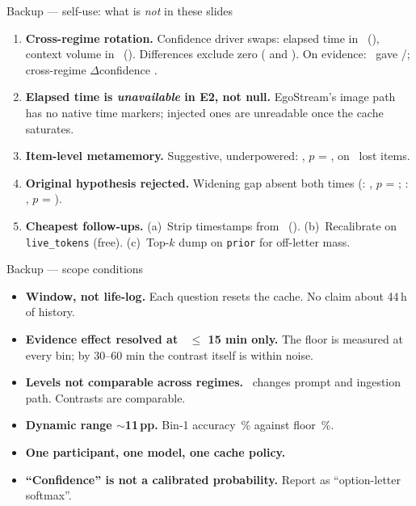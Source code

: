 \begin{frame}[t]{Backup --- self-use: what is \emph{not} in these slides}
  \footnotesize
  \begin{enumerate}\setlength\itemsep{0.35em}
    \item \textbf{Cross-regime rotation.} Confidence driver swaps: elapsed time in \Eone\ (\conf{\EoneElapsedConf}), context volume in \Etwo\ (\conf{\EtwoFourxConf}). Differences exclude zero (\conf{\XregElapsedConf} and \conf{\XregFourxConf}). On evidence: \Eone\ gave \acc{\EoneEvidenceAcc}/\conf{\EoneEvidenceConf}; cross-regime $\Delta$confidence \conf{\XregEvidenceConf}.

    \item \textbf{Elapsed time is \emph{unavailable} in E2, not null.} EgoStream's image path has no native time markers; injected ones are unreadable once the cache saturates.

    \item \textbf{Item-level metamemory.} Suggestive, underpowered: \EtwoItemDiff, $p$ = \EtwoItemDiffP, on \EtwoItemLost\ lost items.

    \item \textbf{Original hypothesis rejected.} Widening gap absent both times (\Eone: \EoneGap, $p$ = \EoneGapP; \Etwo: \EtwoGap, $p$ = \EtwoGapP).

    \item \textbf{Cheapest follow-ups.} (a)~Strip timestamps from \Eone\ (\TimestripCost). (b)~Recalibrate on \texttt{live\_tokens} (free). (c)~Top-$k$ dump on \texttt{prior} for off-letter mass.
  \end{enumerate}
\end{frame}

\begin{frame}[t]{Backup --- scope conditions}
  \begin{itemize}\footnotesize\setlength\itemsep{0.4em}
    \item \textbf{Window, not life-log.} Each question resets the cache. No claim about 44\,h of history.
    \item \textbf{Evidence effect resolved at \dt\ $\leq$ 15 min only.} The floor is measured at every bin; by 30--60 min the contrast itself is within noise.
    \item \textbf{Levels not comparable across regimes.} \Etwo\ changes prompt and ingestion path. Contrasts are comparable.
    \item \textbf{Dynamic range $\sim$11\,pp.} Bin-1 accuracy \EtwoBinOneAcc\,\% against floor \EtwoFloorAcc\,\%.
    \item \textbf{One participant, one model, one cache policy.}
    \item \textbf{``Confidence'' is not a calibrated probability.} Report as ``option-letter softmax''.
  \end{itemize}
\end{frame}
